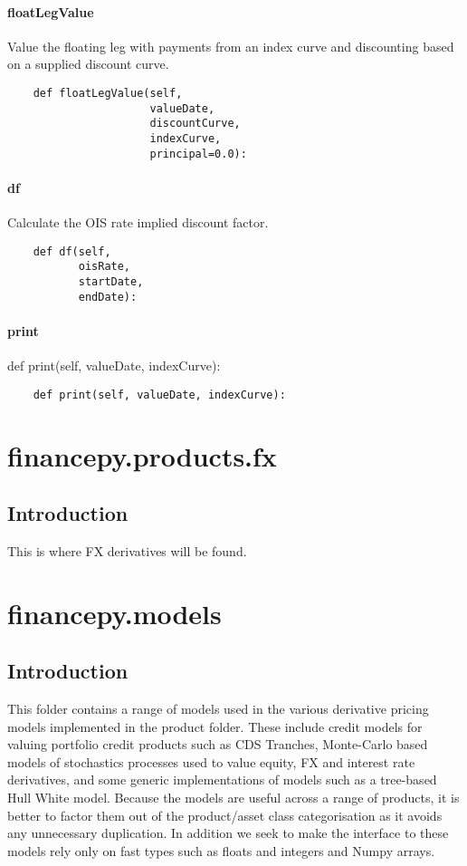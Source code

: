 \documentclass[twoside,11pt]{book}
\begin{document}
\subsubsection*{{\bf floatLegValue}}
Value the floating leg with payments from an index curve and discounting based on a supplied discount curve.  

\begin{lstlisting}
    def floatLegValue(self,
                      valueDate,
                      discountCurve,
                      indexCurve,
                      principal=0.0):
\end{lstlisting}

\subsubsection*{{\bf df}}
Calculate the OIS rate implied discount factor.  

\begin{lstlisting}
    def df(self,
           oisRate,
           startDate,
           endDate):
\end{lstlisting}

\subsubsection*{{\bf print}}
def print(self, valueDate, indexCurve): 

\begin{lstlisting}
    def print(self, valueDate, indexCurve):
\end{lstlisting}


\chapter{financepy.products.fx}
\section{Introduction}

This is where FX derivatives will be found.
\chapter{financepy.models}
\section{Introduction}

This folder contains a range of models used in the various derivative pricing models implemented in the product folder. These include credit models for valuing portfolio credit products such as CDS Tranches, Monte-Carlo based models of stochastics processes used to value equity, FX and interest rate derivatives, and some generic implementations of models such as a tree-based Hull White model. Because the models are useful across a range of products, it is better to factor them out of the product/asset class categorisation as it avoids any unnecessary duplication. In addition we seek to make the interface to these models rely only on fast types such as floats and integers and Numpy arrays.
\end{document}
